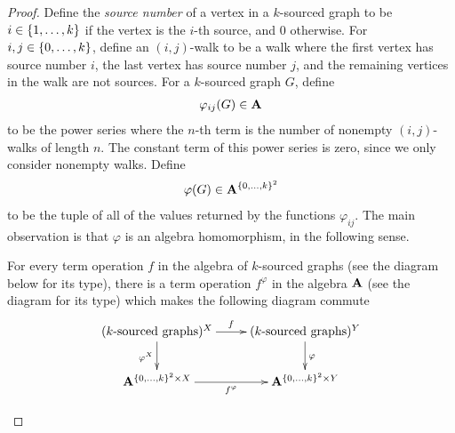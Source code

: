 \begin{proof}
    
    
    
        
        Define the \emph{source number} of a vertex in a $k$-sourced graph to be  $i \in \{1,\ldots,k\}$ if the vertex is the $i$-th source, and $0$ otherwise. For
        $i,j \in \{0,\ldots,k\}$,
        define an  $(i,j)$-walk to be a walk where the first vertex has source number $i$, the last vertex has source number $j$, and the remaining vertices in the walk are not sources. For a $k$-sourced graph $G$, define 
        \begin{align*}
        \varphi_{ij}(G) \in \mathbf{A}
        \end{align*}
         to be the power series where the $n$-th term is the number of nonempty $(i,j)$-walks of length $n$. The constant term  of this power series is zero, since we only consider nonempty walks. Define 
        \begin{align*}
        \varphi(G) \in \mathbf{A}^{\{0,\ldots,k\}^2}
        \end{align*}
        to be the tuple of all of the values returned by the functions $\varphi_{ij}$. 
        The main observation is that $\varphi$ is an algebra homomorphism, in the following sense.
        \begin{claim}
            For every term operation $f$ 
            in the algebra of $k$-sourced graphs (see the diagram below for its type), there is a term operation $f^\varphi$ in the algebra $\mathbf{A}$ (see the diagram for its type) which makes the following diagram commute
            \begin{align*}
            \xymatrix{
                (\text{$k$-sourced graphs})^X 
                \ar[r]^f
                \ar[d]_{\varphi^X}
                &
                 (\text{$k$-sourced graphs})^Y
                \ar[d]^\varphi
                \\
                \aalg^{\set{0,\ldots,k}^2 \times X}
                \ar[r]_{f^\varphi}
                &
                \aalg^{\set{0,\ldots,k}^2 \times Y}
}
\end{align*}
\end{claim}
\end{proof}

